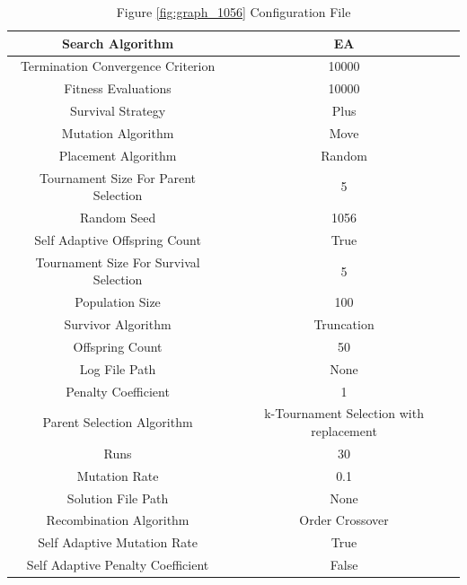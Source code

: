 \documentclass{standalone}
\begin{document}
\begin{table}[!htb]
	\centering
	\caption{Figure \ref{fig:graph_1056} Configuration File}
	\label{tab:graph_1056}
	\begin{tabular}{| c | c |}
		\hline
		Search Algorithm		& EA		 \\
		\hline
		Termination Convergence Criterion		& 10000		 \\
		\hline
		Fitness Evaluations		& 10000		 \\
		\hline
		Survival Strategy		& Plus		 \\
		\hline
		Mutation Algorithm		& Move		 \\
		\hline
		Placement Algorithm		& Random		 \\
		\hline
		Tournament Size For Parent Selection		& 5		 \\
		\hline
		Random Seed		& 1056		 \\
		\hline
		Self Adaptive Offspring Count		& True		 \\
		\hline
		Tournament Size For Survival Selection		& 5		 \\
		\hline
		Population Size		& 100		 \\
		\hline
		Survivor Algorithm		& Truncation		 \\
		\hline
		Offspring Count		& 50		 \\
		\hline
		Log File Path		& None		 \\
		\hline
		Penalty Coefficient		& 1		 \\
		\hline
		Parent Selection Algorithm		& k-Tournament Selection with replacement		 \\
		\hline
		Runs		& 30		 \\
		\hline
		Mutation Rate		& 0.1		 \\
		\hline
		Solution File Path		& None		 \\
		\hline
		Recombination Algorithm		& Order Crossover		 \\
		\hline
		Self Adaptive Mutation Rate		& True		 \\
		\hline
		Self Adaptive Penalty Coefficient		& False		 \\
		\hline
	\end{tabular}
\end{table}
\end{document}
